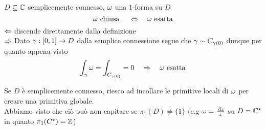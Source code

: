 \begin{cor}$D\subseteq \mathbb{C}$ semplicemente connesso, $\omega$ una $1$-forma su $D$
$$\omega \text{ chiusa } \quad \Leftrightarrow \quad \omega \text{ esatta} $$
\proof $\Leftarrow$ discende direttamente dalla definizione\\
$\Rightarrow$ Dato $\gamma:[0,1]\to D$ dalla semplice connessione segue che $\gamma\sim C_{\gamma(0)}$ dunque per quanto appena visto 
$$\int_\gamma \omega = \int_{C_{\gamma(0)}}=0 \quad \Rightarrow \quad \omega \text{ esatta}$$ 
\begin{oss}Se $D$ \`e semplicemente connesso, riesco ad incollare le primitive locali di $\omega$ per creare una primitiva globale.\\
Abbiamo visto che ci\`o pu\`o non capitare se $\pi_1(D) \neq \{ 1 \}$ (e.g $\omega=\frac{\, \mathrm{d} z }{z}$ su $D=\mathbb{C}^\star$ in quanto $\pi_1(C^\star)=\mathbb{Z}$)
\end{oss}
\end{cor}
